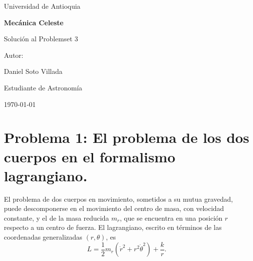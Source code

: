 \documentclass[a4paper]{article}
\begin{document}
\begin{titlepage}
  \centering
  {\Large Universidad de Antioquia\par}
  \vspace{2cm}
  {\huge\bfseries Mecánica Celeste\par}
  \vspace{0.4cm}
  {\Large Solución al Problemset 3 \par}
  \vspace{2.5cm}
  {\large Autor:\par}
  \vspace{0.2cm}
  {\large Daniel Soto Villada\par}
  {\large Estudiante de Astronomía\par}
  \vfill
  {\large \today\par}
\end{titlepage}

\newpage
\tableofcontents
\newpage


\section{Problema 1: El problema de los dos cuerpos en el formalismo lagrangiano.}

El problema de dos cuerpos en movimiento, sometidos a su mutua gravedad, puede descomponerse en el movimiento del centro de masa, con velocidad constante, y el de la masa reducida $m_r$, que se encuentra en una posición $r$ respecto a un centro de fuerza. El lagrangiano, escrito en términos de las coordenadas generalizadas $(r, \theta)$, es
$$L = \frac{1}{2}m_r \left(\dot{r}^2 + r^2\dot{\theta}^2\right) + \frac{k}{r}.$$
\end{document}

